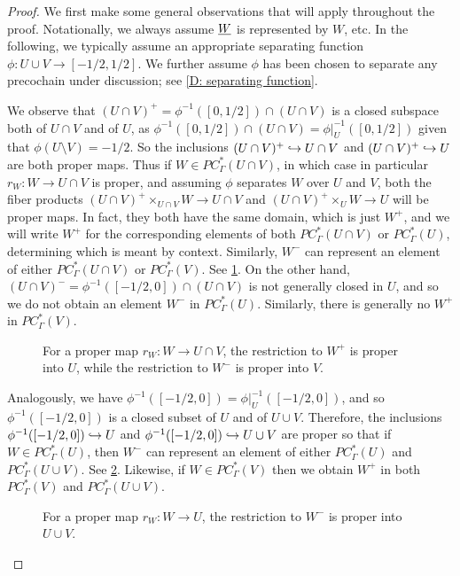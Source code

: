 \begin{proof}
	We first make some general observations that will apply throughout the proof.
	Notationally, we always assume $\underline{W}$ is represented by $W$, etc.
	In the following, we typically assume an appropriate separating function $\phi \colon U \cup V \to [-1/2,1/2]$.
	We further assume $\phi$ has been chosen to separate any precochain under discussion;
	see \cref{D: separating function}.


	We observe that $(U \cap V)^+ = \phi^{-1}([0,1/2])\cap(U \cap V)$ is a closed subspace both of $U \cap V$ and of $U$, as $\phi^{-1}([0,1/2]) \cap (U \cap V) = \phi|_U^{-1}([0,1/2])$ given that $\phi(U\setminus V) = -1/2$.
	So the inclusions $(U \cap V)^+ \hookrightarrow U \cap V$ and $(U \cap V)^+ \hookrightarrow U$ are both proper maps.
	Thus if $W \in PC^*_\Gamma(U \cap V)$, in which case in particular $r_W \colon W \to U \cap V$ is proper, and assuming $\phi$ separates $W$ over $U$ and $V$, both the fiber products $(U \cap V)^+\times_{U \cap V} W \to U \cap V$ and $(U \cap V)^+\times_{U} W \to U$ will be proper maps.
	In fact, they both have the same domain, which is just $W^+$, and we will write $W^+$ for the corresponding elements of both $PC^*_\Gamma(U \cap V)$ or $PC^*_\Gamma(U)$, determining which is meant by context.
	Similarly, $W^-$ can represent an element of either $PC^*_\Gamma(U \cap V)$ or $PC^*_\Gamma(V)$.
	See \cref{F: MV1}.
	On the other hand, $(U \cap V)^- = \phi^{-1}([-1/2,0])\cap(U \cap V)$ is not generally closed in $U$, and so we do not obtain an element $W^-$ in $PC^*_\Gamma(U)$.
	Similarly, there is generally no $W^+$ in $PC^*_\Gamma(V)$.

	\begin{figure}[h]
		
		\caption{For a proper map $r_W \colon W \to U \cap V$, the restriction to $W^+$ is proper into $U$, while the restriction to $W^-$ is proper into $V$.}
		\label{F: MV1}
	\end{figure}

	Analogously, we have $\phi^{-1}([-1/2,0]) = \phi|_U^{-1}([-1/2,0])$, and so $\phi^{-1}([-1/2,0])$ is a closed subset of $U$ and of $U \cup V$.
	Therefore, the inclusions $\phi^{-1}([-1/2,0]) \hookrightarrow U$ and $\phi^{-1}([-1/2,0]) \hookrightarrow U \cup V$ are proper so that if $W \in PC^*_\Gamma(U)$, then $W^-$ can represent an element of either $PC^*_\Gamma(U)$ and $PC^*_\Gamma(U \cup V)$.
	See \cref{F: MV2}.
	Likewise, if $W \in PC^*_\Gamma(V)$ then we obtain $W^+$ in both $PC^*_\Gamma(V)$ and $PC^*_\Gamma(U \cup V)$.

	\begin{figure}[h]
		
		\caption{For a proper map $r_W \colon W \to U$, the restriction to $W^-$ is proper into $U \cup V$.}
		\label{F: MV2}
	\end{figure}


\end{proof}

